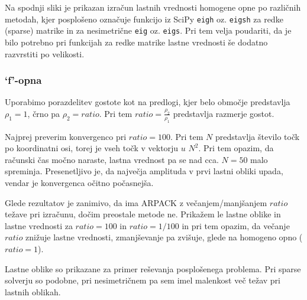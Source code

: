 Na spodnji sliki je prikazan izračun lastnih vrednosti homogene opne po različnih metodah, kjer posplošeno označuje funkcijo iz SciPy \texttt{eigh} oz. \texttt{eigsh} za redke (sparse) matrike in za nesimetrične \texttt{eig} oz. \texttt{eigs}. Pri tem velja poudariti, da je bilo potrebno pri funkcijah za redke matrike lastne vrednosti še dodatno razvrstiti po velikosti.



\subsubsection{`f'-opna}

Uporabimo porazdelitev gostote kot na predlogi, kjer belo območje predstavlja $\rho_1=1$, črno pa $\rho_2=ratio$. Pri tem $ratio=\frac{\rho_2}{\rho_1}$ predstavlja razmerje gostot.

Najprej preverim konvergenco pri $ratio = 100$. Pri tem $N$ predstavlja število točk po koordinatni osi, torej je vseh točk v vektorju $u$ $N^2$. Pri tem opazim, da računski čas močno naraste, lastna vrednost pa se nad cca. $N=50$ malo spreminja. Presenetljivo je, da največja amplituda v prvi lastni obliki upada, vendar je konvergenca očitno počasnejša.
\begin{figure}[H]
    \centering
\end{figure}

Glede rezultatov je zanimivo, da ima ARPACK z večanjem/manjšanjem $ratio$ težave pri izračunu, dočim preostale metode ne. Prikažem le lastne oblike in lastne vrednosti za $ratio=100$ in $ratio=1/100$ in pri tem opazim, da večanje $ratio$ znižuje lastne vrednosti, zmanjševanje pa zvišuje, glede na homogeno opno ($ratio=1$).

Lastne oblike so prikazane za primer reševanja posplošenega problema. Pri sparse solverju so podobne, pri nesimetričnem pa sem imel malenkost več težav pri lastnih oblikah.


